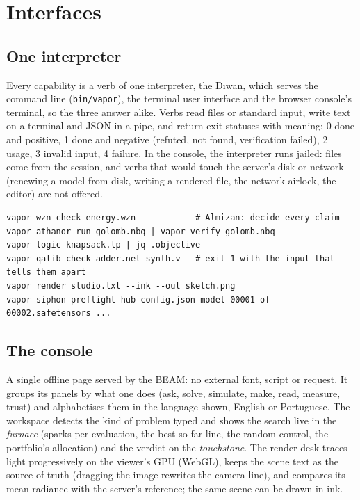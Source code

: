 \chapter{Interfaces}\label{ch:interfaces}

\section{One interpreter}

Every capability is a verb of one interpreter, the Dīwān, which serves the command line
(\texttt{bin/vapor}), the terminal user interface and the browser console's terminal, so the three
answer alike. Verbs read files or standard input, write text on a terminal and JSON in a pipe, and return
exit statuses with meaning: 0 done and positive, 1 done and negative (refuted, not found, verification
failed), 2 usage, 3 invalid input, 4 failure. In the console, the interpreter runs jailed: files come
from the session, and verbs that would touch the server's disk or network (renewing a model from disk,
writing a rendered file, the network airlock, the editor) are not offered.

\begin{lstlisting}
vapor wzn check energy.wzn            # Almizan: decide every claim
vapor athanor run golomb.nbq | vapor verify golomb.nbq -
vapor logic knapsack.lp | jq .objective
vapor qalib check adder.net synth.v   # exit 1 with the input that tells them apart
vapor render studio.txt --ink --out sketch.png
vapor siphon preflight hub config.json model-00001-of-00002.safetensors ...
\end{lstlisting}

\section{The console}

A single offline page served by the BEAM: no external font, script or request. It groups its panels
by what one does (ask, solve, simulate, make, read, measure, trust) and alphabetises them in the language
shown, English or Portuguese. The workspace detects the kind of problem typed and shows the search
live in the \emph{furnace} (sparks per evaluation, the best-so-far line, the random control, the
portfolio's allocation) and the verdict on the \emph{touchstone}. The render desk traces light
progressively on the viewer's GPU (WebGL), keeps the scene text as the source of truth (dragging the
image rewrites the camera line), and compares its mean radiance with the server's reference; the same
scene can be drawn in ink.


